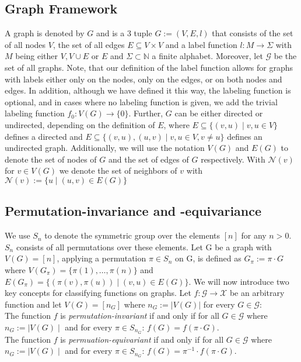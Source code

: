 \documentclass[11pt, dvipsnames, DIV=12]{scrreprt}
\theoremstyle{definition}
\begin{document}
\subsection{Graph Framework}
A graph is denoted by $G$ and is a 3 tuple $G:= (V, E, l)$ that consists of the set of all nodes $V$, the set of all edges $E \subseteq V \times V$ and a label function $l: M \rightarrow \Sigma$ with $M$ being either $V, V \cup E$ or $E$ and $\Sigma \subset \mathbb{N}$ a finite alphabet. Moreover, let $\mathcal{G}$ be the set of all graphs. Note, that our definition of the label function allows for graphs with labels either only on the nodes, only on the edges, or on both nodes and edges. In addition, although we have defined it this way, the labeling function is optional, and in cases where no labeling function is given, we add the trivial labeling function $f_0: V(G) \rightarrow \{0\}$. Further, $G$ can be either directed or undirected, depending on the definition of $E$, where $E \subseteq \{(v,u) \mid v,u \in V\}$ defines a directed and $E \subseteq \{(v, u), (u,v) \mid v,u \in V, v\neq u\}$ defines an undirected graph. Additionally, we will use the notation $V(G)$ and $E(G)$ to denote the set of nodes of $G$ and the set of edges of $G$ respectively. With $\mathcal{N}(v)$ for $v \in V(G)$ we denote the set of neighbors of $v$ with $\mathcal{N}(v) := \{u \mid (u, v) \in E(G)\}$

\subsection{Permutation-invariance and -equivariance}
We use $S_n$ to denote the symmetric group over the elements $[n]$ for any $n > 0$. $S_n$ consists of all permutations over these elements. Let G be a graph with $V(G) = [n]$, applying a permutation $\pi \in S_n$ on G, is defined as $G_\pi := \pi \cdot G$ where $V(G_\pi) = \{\pi(1), \ldots, \pi(n) \}$ and $E(G_\pi) = \{ (\pi(v), \pi(u)) \mid (v,u) \in E(G)\}$. We will now introduce two key concepts for classifying functions on graphs. Let $f: \mathcal{G} \rightarrow \mathcal{X}$ be an arbitrary function and let $V(G) = [n_G]$ where $n_G := |V(G)|$ for every $G \in \mathcal{G}$:\\
\noindent The function $f$ is \textit{permutation-invariant} if and only if for all $G \in \mathcal{G}$ where $n_G := \mid V(G) \mid$ and for every $\pi \in S_{n_G}$: $f(G) = f(\pi \cdot G)$.\\
\noindent The function $f$ is \textit{permuation-equivariant} if and only if for all $G \in \mathcal{G}$ where $n_G := \mid V(G) \mid$ and for every $\pi \in S_{n_G}$: $f(G) = \pi^{-1} \cdot f(\pi \cdot G)$.
\end{document}
